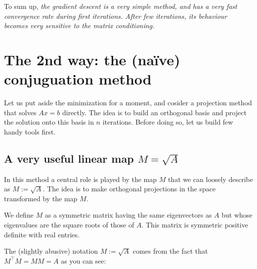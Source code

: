 \documentclass[notitlepage,oneside]{book}
\begin{document}
\vspace{10mm}

To sum up, \textit{the gradient descent is a very simple method, and has a very fast convergence rate during first iterations.
After few iterations, its behaviour becomes very sensitive to the matrix conditioning.}


\section{The 2nd way: the (naïve) conjuguation method}
\label{chap5:sec:linalg:algo_conjugaison}

Let us put aside the minimization for a moment, and cosider a projection method that solves $Ax=b$ directly.
The idea is to build an orthogonal basis and project the solution onto this basis in $n$ iterations.
Before doing so, let us build few handy tools first.

\subsection{A very useful linear map $M=\sqrt{A}$}
In this method a central role is played by the map $M$ that we can loosely describe as $M:=\sqrt{A}$.
The idea is to make orthogonal projections in the space transformed by the map $M$.

\begin{framed}
We define $M$ as a symmetric matrix having the same eigenvectors as $A$ but whose eigenvalues are the square roots of those of $A$.
This matrix is symmetric positive definite with real entries.
\end{framed}
The (slightly abusive) notation $M := \sqrt{A}$ comes from the fact that $M^\top M=MM=A$ as you can see:
\end{document}
